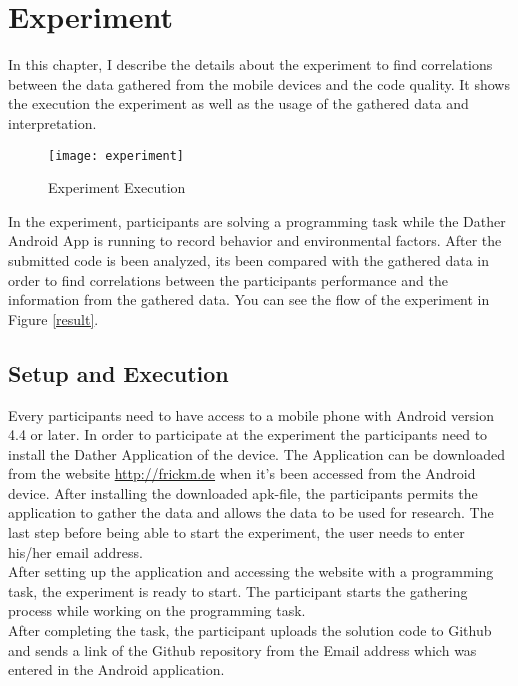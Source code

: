 \chapter{Experiment}
In this chapter, I describe the details about the experiment to find correlations between the data gathered from the mobile devices and the code quality. It shows the execution the experiment as  well as the usage of the gathered data and interpretation. 

\begin{figure}
\texttt{[image: experiment]}
\caption{Experiment Execution}\label{experiment}
\vspace{10 mm}
\end{figure}

In the experiment, participants are solving a programming task while the Dather Android App is running to record behavior and environmental factors. After the submitted code is been analyzed, its been compared with the gathered data in order to find correlations between the participants performance and the information from the gathered data. You can see the flow of the experiment in Figure \ref{result}. 
\section{Setup and Execution}
Every participants need to have access to a mobile phone with Android version 4.4 or later. In order to participate at the experiment the participants need to install the Dather Application of the device. The Application can be downloaded from the website \url{http://frickm.de} when it's been accessed from the Android device. 
After installing the downloaded apk-file, the participants permits the application to gather the data and allows the data to be used for research. 
The last step before being able to start the experiment, the user needs to enter his/her email address.\\
After setting up the application and accessing the website with a programming task, the experiment is ready to start. The participant starts the gathering process while working on the programming task.\\
After completing the task, the participant uploads the solution code to Github and sends a link of the Github repository from the Email address which was entered in the Android application. 

